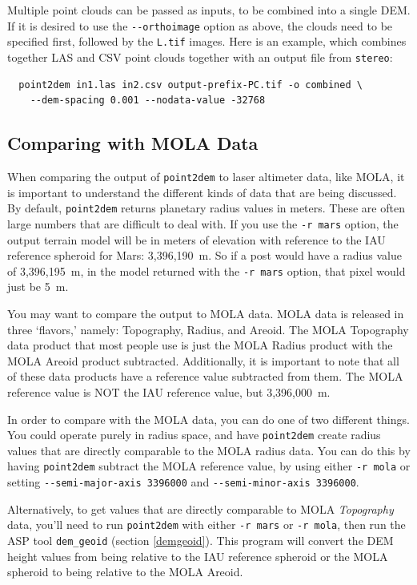 Multiple point clouds can be passed as inputs, to be combined into a
single \ac{DEM}. If it is desired to use the \texttt{-\/-orthoimage}
option as above, the clouds need to be specified first, followed by the
\texttt{L.tif} images. Here is an example, which combines together LAS
and CSV point clouds together with an output file from {\tt stereo}:
\begin{verbatim}
  point2dem in1.las in2.csv output-prefix-PC.tif -o combined \
    --dem-spacing 0.001 --nodata-value -32768
\end{verbatim}

\subsection{Comparing with MOLA Data}
\label{molacmp}

When comparing the output of \texttt{point2dem} to laser altimeter
data, like MOLA, it is important to understand the different kinds
of data that are being discussed.  By default, \texttt{point2dem}
returns planetary radius values in meters.  These are often large
numbers that are difficult to deal with.  If you use the \texttt{-r
mars} option, the output terrain model will be in meters of elevation
with reference to the IAU reference spheroid for Mars: 3,396,190~m.
So if a post would have a radius value of 3,396,195~m, in the model
returned with the \texttt{-r mars} option, that pixel would just be 5~m.

You may want to compare the output to MOLA data.  MOLA data is
released in three `flavors,' namely: Topography, Radius, and Areoid.
The MOLA Topography data product that most people use is just the MOLA Radius
product with the MOLA Areoid product subtracted.  Additionally, it is
important to note that all of these data products have a reference
value subtracted from them.  The MOLA reference value is NOT the
IAU reference value, but 3,396,000~m.

In order to compare with the MOLA data, you can do one of two different
things.  You could operate purely in radius space, and have
\texttt{point2dem} create radius values that are directly comparable to
the MOLA radius data.  You can do this by having \texttt{point2dem}
subtract the MOLA reference value, by using either \texttt{-r
mola} or setting \texttt{-\/-semi-major-axis 3396000} and
\texttt{-\/-semi-minor-axis 3396000}.

Alternatively, to get values that are directly comparable to MOLA
\textit{Topography} data, you'll need to run \texttt{point2dem} with
either \texttt{-r mars} or \texttt{-r mola}, then run the ASP tool
\texttt{dem\_geoid} (section \ref{demgeoid}). This program will convert
the DEM height values from being relative to the IAU reference spheroid
or the MOLA spheroid to being relative to the MOLA Areoid.


